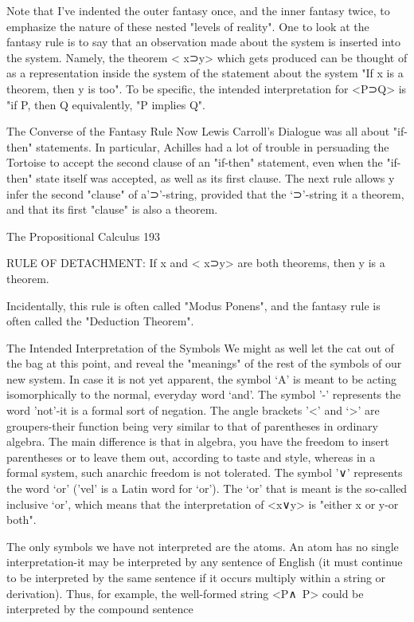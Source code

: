        Note that I've indented the outer fantasy once, and the inner fantasy twice, to
emphasize the nature of these nested "levels of reality". One to look at the fantasy rule is
to say that an observation made about the system is inserted into the system. Namely, the
theorem < x⊃y> which gets produced can be thought of as a representation inside the
system of the statement about the system "If x is a theorem, then y is too". To be specific,
the intended interpretation for <P⊃Q> is "if P, then Q equivalently, "P implies Q".

                        The Converse of the Fantasy Rule
Now Lewis Carroll's Dialogue was all about "if-then" statements. In particular, Achilles
had a lot of trouble in persuading the Tortoise to accept the second clause of an "if-then"
statement, even when the "if-then" state itself was accepted, as well as its first clause. The
next rule allows y infer the second "clause" of a'⊃'-string, provided that the `⊃'-string it a
theorem, and that its first "clause" is also a theorem.




The Propositional Calculus                                                                193

RULE OF DETACHMENT: If x and < x⊃y> are both theorems, then y is a theorem.

Incidentally, this rule is often called "Modus Ponens", and the fantasy rule is often called
the "Deduction Theorem".

                   The Intended Interpretation of the Symbols
We might as well let the cat out of the bag at this point, and reveal the "meanings" of the
rest of the symbols of our new system. In case it is not yet apparent, the symbol `A' is
meant to be acting isomorphically to the normal, everyday word `and'. The symbol '-'
represents the word 'not'-it is a formal sort of negation. The angle brackets '<' and `>' are
groupers-their function being very similar to that of parentheses in ordinary algebra. The
main difference is that in algebra, you have the freedom to insert parentheses or to leave
them out, according to taste and style, whereas in a formal system, such anarchic freedom
is not tolerated. The symbol '∨' represents the word `or' ('vel' is a Latin word for `or'). The
`or' that is meant is the so-called inclusive `or', which means that the interpretation of
<x∨y> is "either x or y-or both".

        The only symbols we have not interpreted are the atoms. An atom has no single
interpretation-it may be interpreted by any sentence of English (it must continue to be
interpreted by the same sentence if it occurs multiply within a string or derivation). Thus,
for example, the well-formed string <P∧~P> could be interpreted by the compound
sentence

